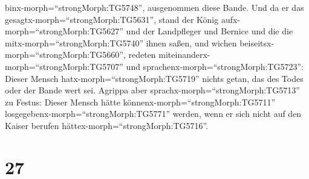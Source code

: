 binx-morph=``strongMorph:TG5748'', ausgenommen diese Bande.
 Und da er das gesagtx-morph=``strongMorph:TG5631'', stand
der König aufx-morph=``strongMorph:TG5627'' und der Landpfleger und
Bernice und die die mitx-morph=``strongMorph:TG5740'' ihnen saßen,
 und wichen beiseitsx-morph=``strongMorph:TG5660'', redeten
miteinanderx-morph=``strongMorph:TG5707'' und
sprachenx-morph=``strongMorph:TG5723'': Dieser Mensch
hatx-morph=``strongMorph:TG5719'' nichts getan, das des Todes oder der
Bande wert sei.  Agrippa aber
sprachx-morph=``strongMorph:TG5713'' zu Festus: Dieser Mensch hätte
könnenx-morph=``strongMorph:TG5711''
losgegebenx-morph=``strongMorph:TG5771'' werden, wenn er sich nicht auf
den Kaiser berufen hättex-morph=``strongMorph:TG5716''.

\hypertarget{section-26}{%
\section{27}\label{section-26}}

